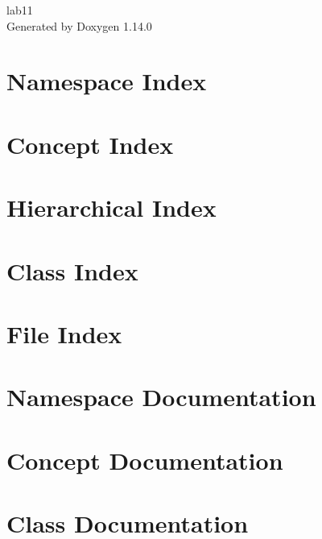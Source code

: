 \documentclass[twoside]{book}
\newcommand{\+}{\discretionary{\mbox{\scriptsize$\hookleftarrow$}}{}{}}
\newcommand{\clearemptydoublepage}{%
    \newpage{\pagestyle{empty}\cleardoublepage}%
  }
\begin{document}
  \raggedbottom
    \hypersetup{pageanchor=false,
                bookmarksnumbered=true,
                pdfencoding=unicode
               }
  \begin{titlepage}
  \vspace*{7cm}
  \begin{center}%
  {\Large lab11}\\
  \vspace*{1cm}
  {\large Generated by Doxygen 1.14.0}\\
  \end{center}
  \end{titlepage}
  \clearemptydoublepage
  \tableofcontents
  \clearemptydoublepage
  \hypersetup{pageanchor=true}
\chapter{Namespace Index}

\chapter{Concept Index}

\chapter{Hierarchical Index}

\chapter{Class Index}

\chapter{File Index}

\chapter{Namespace Documentation}

\chapter{Concept Documentation}

\chapter{Class Documentation}

















\end{document}
